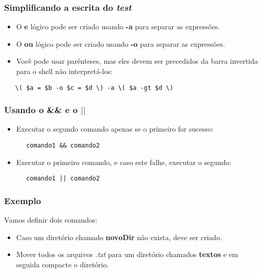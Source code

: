 \documentclass{beamer}
\begin{document}
\begin{frame}[fragile]
   \frametitle{Simplificando a escrita do \textit{test}}
   \begin{itemize}
      \item O \textbf{e} lógico pode ser criado usando \textbf{-a} para separar as expressões.
      \item O \textbf{ou} lógico pode ser criado usando \textbf{-o} para separar as expressões.
      \item Você pode usar parênteses, mas eles devem ser precedidos da barra invertida para o shell não interpretá-los:
   \end{itemize}
   \begin{verbatim}
   \( $a = $b -o $c = $d \) -a \( $a -gt $d \)
   \end{verbatim}
\end{frame}

   \begin{frame}[fragile]
      \frametitle{Usando o \&\& e o $||$}
      \begin{itemize}
         \item Executar o segundo comando apenas se o primeiro for sucesso: 
      \end{itemize}
      
      \begin{verbatim}
      comando1 && comando2
      \end{verbatim}

      \begin{itemize}
         \item Executar o primeiro comando, e caso este falhe, executar o segundo: 
      \end{itemize}
      
      \begin{verbatim}
      comando1 || comando2
      \end{verbatim}
\end{frame}

   \begin{frame}
      \frametitle{Exemplo}
      Vamos definir dois comandos:
      \begin{itemize}
         \item Caso um diretório chamado \textbf{novoDir} não exista, deve ser criado.
	      \item Mover todos os arquivos \textit{.txt} para um diretório chamados \textbf{textos} e em seguida compacte o diretório.
      \end{itemize}
   \end{frame}
\end{document}
